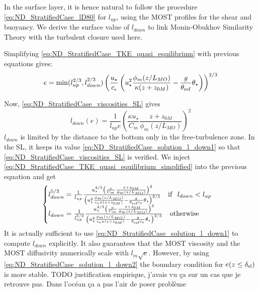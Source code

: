 In the surface layer, it is hence natural to follow the
procedure \eqref{eq:ND_StratifiedCase_lD80} for $l_{up}$,
using the MOST profiles for the shear and buoyancy.
We derive the surface value of $l_{down}$ to link Monin-Obukhov
Similarity Theory with the turbulent closure used here.
\par
Simplifying \eqref{eq:ND_StratifiedCase_TKE_quasi_equilibrium}
with previous equations gives:
\begin{equation}
	\label{eq:ND_StratifiedCase_TKE_quasi_equilibrium_simplified}
	e = \min(l_{up}^{2/3}, l_{down}^{2/3})\left(
	\frac{u_\star}{c_\epsilon} 
	\left({u}_\star^2
	\frac{\phi_m(z/L_{MO})}{\kappa (z+z_{0M})}
	- \frac{g}{\theta_{\rm ref}}\theta_\star
	\right)
	\right)^{2/3}
\end{equation}

Now, \eqref{eq:ND_StratifiedCase_viscosities_SL} gives
\begin{equation}
	\label{eq:ND_StratifiedCase_solution_l_down1}
	l_{down}(e) = \frac{1}{l_{up} e} \left(
	\frac{\kappa u_\star}{C_m}
	\frac{z + z_{0M}}{\phi_m(z/L_{MO})}
\right)^2
\end{equation}
$l_{down}$ is limited by the distance to the bottom only
in the free-turbulence zone. In the SL, it keeps its value
\eqref{eq:ND_StratifiedCase_solution_l_down1}
so that \eqref{eq:ND_StratifiedCase_viscosities_SL} is
verified.
We inject \eqref{eq:ND_StratifiedCase_TKE_quasi_equilibrium_simplified}
into the previous equation and get
\begin{equation}
	\label{eq:ND_StratifiedCase_solution_l_down2}
	\begin{cases}
	l_{down}^{5/3} = \frac{1}{l_{up}} \frac{u_\star^{4/3}\left(
	\frac{\kappa}{C_m}
	\frac{z + z_{0M}}{\phi_m(z/L_{MO})}
	\right)^2}{
	\left({u}_\star^2
	\frac{\phi_m(z/L_{MO})}{c_\epsilon\kappa (z+z_{0M})}
	- \frac{g}{\theta_{\rm ref}c_\epsilon}\theta_\star
	\right)^{2/3}} ~~~ {\rm if } ~~l_{down} < l_{up}\\
	l_{down} = \frac{1}{l_{up}^{5/3}} \frac{u_\star^{4/3}\left(
	\frac{\kappa}{C_m}
	\frac{z + z_{0M}}{\phi_m(z/L_{MO})}
	\right)^2}{
	\left({u}_\star^2
	\frac{\phi_m(z/L_{MO})}{c_\epsilon\kappa (z+z_{0M})}
	- \frac{g}{\theta_{\rm ref}c_\epsilon}\theta_\star
	\right)^{2/3}} ~~~ {\rm otherwise}\\
	\end{cases}
\end{equation}
It is actually sufficient to use
\eqref{eq:ND_StratifiedCase_solution_l_down1}
to compute $l_{down}$ explicitly. It also guarantees that
the MOST viscosity and the MOST diffusivity numerically
scale with $l_m\sqrt{e}$.
However, by using \eqref{eq:ND_StratifiedCase_solution_l_down2}
the boundary condition for $e(z \leq \delta_{\rm sl})$ is more
stable. {\color{red} TODO justification empirique, j'avais
vu ça sur un cas que je retrouve pas. Dans l'océan ça
a pas l'air de poser problème}
